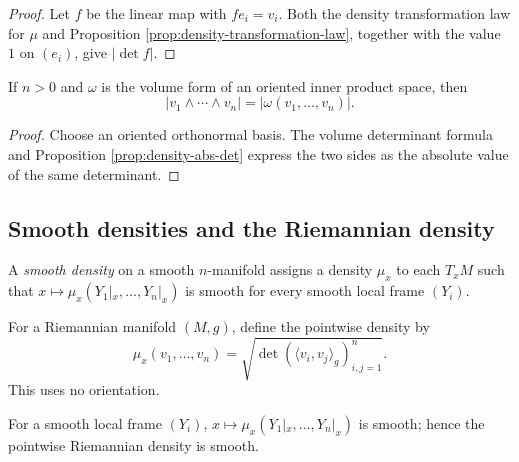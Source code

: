 \begin{proof}
\leanok
{}
\sketch Let $f$ be the linear map with $fe_i=v_i$. Both the density transformation law for $\mu$ and Proposition \ref{prop:density-transformation-law}, together with the value $1$ on $(e_i)$, give $|\det f|$.
\end{proof}

\begin{proposition}
\label{prop:density-eq-abs-volume-form}
\leanok
{}
If $n>0$ and $\omega$ is the volume form of an oriented inner product space, then
\[
|v_1\wedge\cdots\wedge v_n|=|\omega(v_1,\ldots,v_n)|.
\]
\end{proposition}

\begin{proof}
\leanok
{}
\sketch Choose an oriented orthonormal basis. The volume determinant formula and Proposition \ref{prop:density-abs-det} express the two sides as the absolute value of the same determinant.
\end{proof}

\subsection{Smooth densities and the Riemannian density}

\begin{definition}
\label{def:smooth-density}
\leanok
{}
A \emph{smooth density} on a smooth $n$-manifold assigns a density $\mu_x$ to each $T_xM$ such that $x\mapsto\mu_x(Y_1|_x,\ldots,Y_n|_x)$ is smooth for every smooth local frame $(Y_i)$.
\end{definition}

\begin{definition}
\label{def:riemannian-density-pointwise}
\leanok
{}
For a Riemannian manifold $(M,g)$, define the pointwise density by
\[
\mu_x(v_1,\ldots,v_n)=\sqrt{\det(\langle v_i,v_j\rangle_g)_{i,j=1}^n}.
\]
This uses no orientation.
\end{definition}

\begin{proposition}
\label{prop:density-smooth}
\leanok
{}
For a smooth local frame $(Y_i)$, $x\mapsto\mu_x(Y_1|_x,\ldots,Y_n|_x)$ is smooth; hence the pointwise Riemannian density is smooth.
\end{proposition}

